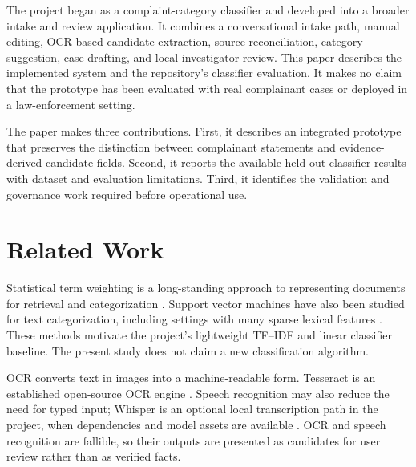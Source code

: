 \documentclass[conference]{IEEEtran}
\begin{document}
The project began as a complaint-category classifier and developed into a broader intake and review application. It combines a conversational intake path, manual editing, OCR-based candidate extraction, source reconciliation, category suggestion, case drafting, and local investigator review. This paper describes the implemented system and the repository's classifier evaluation. It makes no claim that the prototype has been evaluated with real complainant cases or deployed in a law-enforcement setting.

The paper makes three contributions. First, it describes an integrated prototype that preserves the distinction between complainant statements and evidence-derived candidate fields. Second, it reports the available held-out classifier results with dataset and evaluation limitations. Third, it identifies the validation and governance work required before operational use.

\section{Related Work}
Statistical term weighting is a long-standing approach to representing documents for retrieval and categorization \cite{saltonBuckley}. Support vector machines have also been studied for text categorization, including settings with many sparse lexical features \cite{joachims}. These methods motivate the project's lightweight TF--IDF and linear classifier baseline. The present study does not claim a new classification algorithm.

OCR converts text in images into a machine-readable form. Tesseract is an established open-source OCR engine \cite{smith2007}. Speech recognition may also reduce the need for typed input; Whisper is an optional local transcription path in the project, when dependencies and model assets are available \cite{radford2023}. OCR and speech recognition are fallible, so their outputs are presented as candidates for user review rather than as verified facts.
\end{document}
